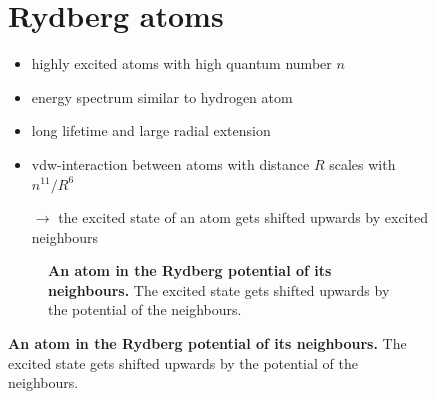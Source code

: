 \documentclass[a0,plainsections]{sciposter}
\begin{document}
\maketitle	%
\vspace*{-20pt}
{\color{rot}{\rule{\textwidth}{4pt}}}

\begin{multicols}{2}

	\addtocounter{figure}{-1}
	\begin{figure}
		\begin{minipage}[t]{0.5\textwidth}
			\section{Rydberg atoms}
			\begin{itemize}
				\item highly excited atoms with high quantum number $n$
				\item energy spectrum similar to hydrogen atom
				\item long lifetime and large radial extension
				\item \ac{vdw}-interaction between atoms with distance $R$ scales with $n^{11}/R^6$ \cite{Sibalic2018,Jahangiri2019}
				\item[\textcolor{rot}{$\rightarrow$}]\textcolor{rot}{the excited state of an atom gets shifted upwards by excited neighbours}
			\end{itemize}
		\end{minipage}
		\hfill
		\begin{minipage}[t]{0.48\textwidth}
			\addtocounter{figure}{-1}
			\begin{figure}
				\vspace*{-175pt} %
				\captionsetup{type=figure}
				
				\caption{\textbf{An atom in the Rydberg potential of its neighbours.} The excited state gets shifted upwards by the potential of the neighbours.}
				\label{fig:RydbergPotential}
			\end{figure}

		\end{minipage}%
	\end{figure}

	\vspace*{-10pt}
	\addtocounter{figure}{-2}
	\begin{figure}

\end{figure}
\end{multicols}
\end{document}
